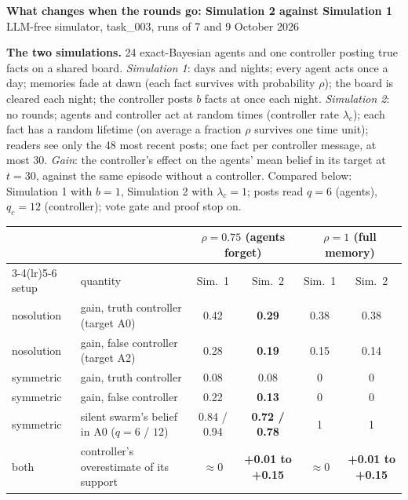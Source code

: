 \documentclass[10pt,a4paper]{article}
\begin{document}
\begin{center}
{\Large\textbf{What changes when the rounds go: Simulation 2 against Simulation 1}}\\[3pt]
{\small LLM-free simulator, task\_003, runs of 7 and 9 October 2026}
\end{center}

\noindent\textbf{The two simulations.} 24 exact-Bayesian agents and one controller posting
true facts on a shared board. \emph{Simulation 1}: days and nights; every agent acts once a
day; memories fade at dawn (each fact survives with probability $\rho$); the board is cleared
each night; the controller posts $b$ facts at once each night. \emph{Simulation 2}: no rounds;
agents and controller act at random times (controller rate $\lambda_c$); each fact has a random
lifetime (on average a fraction $\rho$ survives one time unit); readers see only the 48 most
recent posts; one fact per controller message, at most 30. \emph{Gain}: the controller's effect
on the agents' mean belief in its target at $t = 30$, against the same episode without a
controller. Compared below: Simulation 1 with $b = 1$, Simulation 2 with $\lambda_c = 1$; posts
read $q = 6$ (agents), $q_c = 12$ (controller); vote gate and proof stop on.

\begin{center}\small
\begin{tabular}{llcccc}
\toprule
 & & \multicolumn{2}{c}{$\rho = 0.75$ (agents forget)} & \multicolumn{2}{c}{$\rho = 1$ (full memory)} \\
\cmidrule(lr){3-4}\cmidrule(lr){5-6}
setup & quantity & Sim.\ 1 & Sim.\ 2 & Sim.\ 1 & Sim.\ 2 \\
\midrule
nosolution & gain, truth controller (target A0) & 0.42 & \textbf{0.29} & 0.38 & 0.38 \\
nosolution & gain, false controller (target A2) & 0.28 & \textbf{0.19} & 0.15 & 0.14 \\
symmetric & gain, truth controller & 0.08 & 0.08 & 0 & 0 \\
symmetric & gain, false controller & 0.22 & \textbf{0.13} & 0 & 0 \\
symmetric & silent swarm's belief in A0 ($q = 6$ / $12$) & 0.84 / 0.94 & \textbf{0.72 / 0.78} & 1 & 1 \\
both & controller's overestimate of its support & $\approx 0$ & \textbf{+0.01 to +0.15} & $\approx 0$ & \textbf{+0.01 to +0.15} \\
\bottomrule
\end{tabular}
\end{center}
\end{document}
